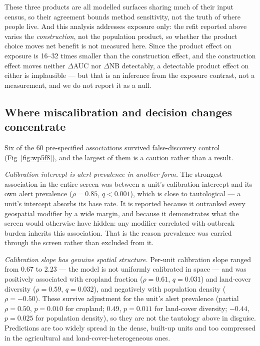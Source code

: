 These three products are all modelled surfaces sharing much of their input census, so their agreement bounds method sensitivity, not the truth of where people live. And this analysis addresses exposure only: the refit reported above varies the \emph{construction}, not the population product, so whether the product choice moves net benefit is not measured here. Since the product effect on exposure is 16--32 times smaller than the construction effect, and the construction effect moves neither $\Delta$AUC nor $\Delta$NB detectably, a detectable product effect on either is implausible --- but that is an inference from the exposure contrast, not a measurement, and we do not report it as a null.

\subsection{Where miscalibration and decision changes concentrate}
\label{sec:results-wp5-f8}

Six of the 60 pre-specified associations survived false-discovery control (Fig~\ref{fig:wp5f8}), and the largest of them is a caution rather than a result.

\emph{Calibration intercept is alert prevalence in another form.} The strongest association in the entire screen was between a unit's calibration intercept and its own alert prevalence ($\rho=0.85$, $q<0.001$), which is close to tautological --- a unit's intercept absorbs its base rate. It is reported because it outranked every geospatial modifier by a wide margin, and because it demonstrates what the screen would otherwise have hidden: any modifier correlated with outbreak burden inherits this association. That is the reason prevalence was carried through the screen rather than excluded from it.

\emph{Calibration slope has genuine spatial structure.} Per-unit calibration slope ranged from 0.67 to 2.23 --- the model is not uniformly calibrated in space --- and was positively associated with cropland fraction ($\rho=0.61$, $q=0.031$) and land-cover diversity ($\rho=0.59$, $q=0.032$), and negatively with population density ($\rho=-0.50$). These survive adjustment for the unit's alert prevalence (partial $\rho=0.50$, $p=0.010$ for cropland; $0.49$, $p=0.011$ for land-cover diversity; $-0.44$, $p=0.025$ for population density), so they are not the tautology above in disguise. Predictions are too widely spread in the dense, built-up units and too compressed in the agricultural and land-cover-heterogeneous ones.

